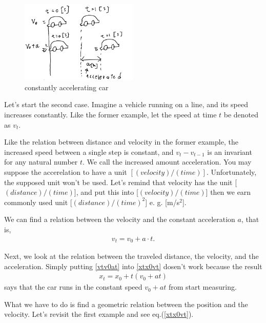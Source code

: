 \documentclass[pdflatex,sn-mathphys-num]{sn-jnl}%
\theoremstyle{thmstyleone}%
\theoremstyle{thmstyletwo}%
\theoremstyle{thmstylethree}%
\begin{document}
\begin{figure}[H]
	\centering
	\includegraphics[width=0.5\textwidth]{images/accCar.png}
	\caption{constantly accelerating car}
	\label{cacar}
\end{figure}

Let's start the second case. Imagine a vehicle running on a line, and its speed increases constantly. Like the former example, let the speed at time $t$ be denoted as $v_t$.

Like the relation between distance and velocity in the former example, the increased speed between a single step is constant, and $v_t-v_{t-1}$ is an invariant for any natural number $t$. We call the increased amount acceleration. You may suppose the accerelation to have a unit $[(velocity)/(time)]$. Unfortunately, the supposed unit won't be used. Let's remind that velocity has the unit [$(distance)/(time)$], and put this into [$(velocity)/(time)$] then we earn commonly used unit [$(distance)/(time)^2$] e. g. [m/s$^2$].

We can find a relation between the velocity and the constant acceleration $a$, that is,
\begin{eqnarray}\label{vtv0at}
	v_t = v_0 + a \cdot t .
\end{eqnarray}

Next, we look at the relation between the traveled distance, the velocity, and the acceleration. 
Simply putting \ref{vtv0at} into \ref{xtx0vt} dosen't work because the result
\begin{eqnarray}
	x_t = x_0 + t(v_0 + at )
\end{eqnarray}
says that the car runs in the constant speed $v_0 + at$ from start measuring.

What we have to do is find a geometric relation between the position and the velocity. Let's revisit the first example and see eq.(\ref{xtx0vt}).
\end{document}
